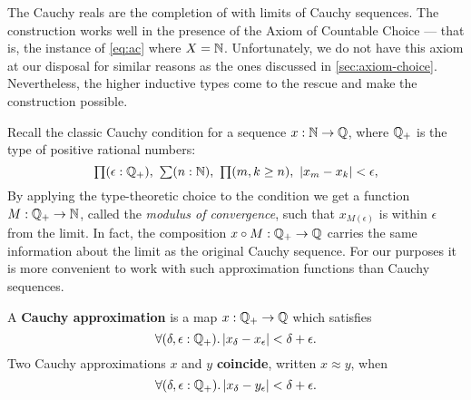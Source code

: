 The Cauchy reals are the completion of \Q with limits of Cauchy sequences. The
construction works well in the presence of the Axiom of Countable Choice --- 
that is, the instance of \autoref{eq:ac} where $X=\mathbb{N}$. 
Unfortunately, we do not have this axiom at our disposal for similar reasons as the ones discussed in
\autoref{sec:axiom-choice}. Nevertheless, the higher inductive types come to the rescue and
make
the construction possible.

Recall the classic Cauchy condition for a sequence $x : \mathbb{N} \to \mathbb{Q}$, where $\mathbb{Q}_{+}$ is the
type of positive rational numbers:
%
\[ \prd{\epsilon : \Qp} \sm{n : \N} \prd{m, k \geq n} |x_m - x_k| < \epsilon, \]
%
By applying the type-theoretic choice to the condition we get a function $M : \mathbb{Q}_{+} \to \mathbb{N}$,
called the \emph{modulus of convergence}, such that $x_{M(\epsilon)}$ is within $\epsilon$
from the limit. In fact, the composition $x \circ M : \mathbb{Q}_{+} \to \mathbb{Q}$ carries the same
information about the limit as the original Cauchy sequence. For our purposes it is more
convenient to work with such approximation functions than Cauchy sequences.

\begin{defn}\label{defn:cauchy-approximation}
  A \textbf{Cauchy approximation} is a map $x : \mathbb{Q}_{+} \to \mathbb{Q}$ which satisfies
  \begin{equation}
    \label{eq:cauchy-approx}
    \fall{\delta, \epsilon :\Qp} |x_\delta - x_\epsilon| < \delta + \epsilon.
  \end{equation}
  Two Cauchy approximations $x$ and $y$ \textbf{coincide}, written $x \approx y$, when
  \begin{equation}
    \label{eq:cauchy-coincide}
    \fall{\delta, \epsilon:\Qp} |x_\delta - y_\epsilon| < \delta + \epsilon.
  \end{equation}
\end{defn}

